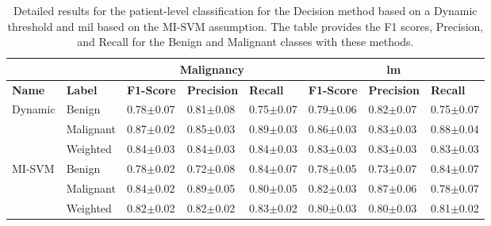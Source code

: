 \documentclass[journal,article,accept,moreauthors,pdftex, applsci]{Definitions/mdpi}
\begin{document}
\par
\begin{table}[H]
    \centering
    \begin{tabular}{lllll||lll}
                                &                   & \multicolumn{3}{c}{\textbf{Malignancy}}                               & \multicolumn{3}{c}{\textbf{\ac{lm}}}                                  \\ \hline
    \textbf{Name}               & \textbf{Label}    & \textbf{F1-Score}     & \textbf{Precision}    & \textbf{Recall}       & \textbf{F1-Score}     & \textbf{Precision}    & \textbf{Recall}       \\ \hline
    \multirow{3}{*}{Dynamic}    & Benign            & 0.78$\pm$0.07         & 0.81$\pm$0.08         & 0.75$\pm$0.07         & 0.79$\pm$0.06         & 0.82$\pm$0.07         & 0.75$\pm$0.07         \\ \cline{2-8}  
                                & Malignant         & 0.87$\pm$0.02         & 0.85$\pm$0.03         & 0.89$\pm$0.03         & 0.86$\pm$0.03         & 0.83$\pm$0.03         & 0.88$\pm$0.04         \\ \cline{2-8} 
                                & Weighted          & 0.84$\pm$0.03         & 0.84$\pm$0.03         & 0.84$\pm$0.03         & 0.83$\pm$0.03         & 0.83$\pm$0.03         & 0.83$\pm$0.03         \\ \hline
    \multirow{3}{*}{MI-SVM}     & Benign            & 0.78$\pm$0.02         & 0.72$\pm$0.08         & 0.84$\pm$0.07         & 0.78$\pm$0.05         & 0.73$\pm$0.07         & 0.84$\pm$0.07         \\ \cline{2-8}
                                & Malignant         & 0.84$\pm$0.02         & 0.89$\pm$0.05         & 0.80$\pm$0.05         & 0.82$\pm$0.03         & 0.87$\pm$0.06         & 0.78$\pm$0.07         \\ \cline{2-8} 
                                & Weighted          & 0.82$\pm$0.02         & 0.82$\pm$0.02         & 0.83$\pm$0.02         & 0.80$\pm$0.03         & 0.80$\pm$0.03         & 0.81$\pm$0.02         \\ \hline 
    \end{tabular}    
    \caption{Detailed results for the patient-level classification for the Decision method based on a Dynamic threshold and \ac{mil} based on the MI-SVM assumption. The table provides the F1 scores, Precision, and Recall for the Benign and Malignant classes with these methods.}
    \label{tab:patient_results_details}
\end{table}\par
\end{document}
